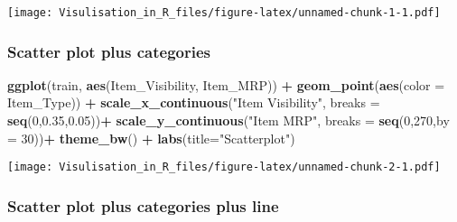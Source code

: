 \documentclass[]{article}
\newenvironment{Shaded}{\begin{snugshade}}{\end{snugshade}}
\newcommand{\KeywordTok}[1]{\textcolor[rgb]{0.13,0.29,0.53}{\textbf{#1}}}
\newcommand{\DataTypeTok}[1]{\textcolor[rgb]{0.13,0.29,0.53}{#1}}
\newcommand{\DecValTok}[1]{\textcolor[rgb]{0.00,0.00,0.81}{#1}}
\newcommand{\FloatTok}[1]{\textcolor[rgb]{0.00,0.00,0.81}{#1}}
\newcommand{\StringTok}[1]{\textcolor[rgb]{0.31,0.60,0.02}{#1}}
\newcommand{\OperatorTok}[1]{\textcolor[rgb]{0.81,0.36,0.00}{\textbf{#1}}}
\newcommand{\NormalTok}[1]{#1}
\begin{document}
\texttt{[image: Visulisation\_in\_R\_files/figure-latex/unnamed-chunk-1-1.pdf]}

\subsubsection{Scatter plot plus
categories}\label{scatter-plot-plus-categories}

\begin{Shaded}
\begin{Highlighting}[]
\KeywordTok{ggplot}\NormalTok{(train, }\KeywordTok{aes}\NormalTok{(Item_Visibility, Item_MRP)) }\OperatorTok{+}\StringTok{ }\KeywordTok{geom_point}\NormalTok{(}\KeywordTok{aes}\NormalTok{(}\DataTypeTok{color =}\NormalTok{ Item_Type)) }\OperatorTok{+}\StringTok{ }
\StringTok{  }\KeywordTok{scale_x_continuous}\NormalTok{(}\StringTok{"Item Visibility"}\NormalTok{, }\DataTypeTok{breaks =} \KeywordTok{seq}\NormalTok{(}\DecValTok{0}\NormalTok{,}\FloatTok{0.35}\NormalTok{,}\FloatTok{0.05}\NormalTok{))}\OperatorTok{+}
\StringTok{  }\KeywordTok{scale_y_continuous}\NormalTok{(}\StringTok{"Item MRP"}\NormalTok{, }\DataTypeTok{breaks =} \KeywordTok{seq}\NormalTok{(}\DecValTok{0}\NormalTok{,}\DecValTok{270}\NormalTok{,}\DataTypeTok{by =} \DecValTok{30}\NormalTok{))}\OperatorTok{+}
\StringTok{  }\KeywordTok{theme_bw}\NormalTok{() }\OperatorTok{+}\StringTok{ }\KeywordTok{labs}\NormalTok{(}\DataTypeTok{title=}\StringTok{"Scatterplot"}\NormalTok{)}
\end{Highlighting}
\end{Shaded}

\texttt{[image: Visulisation\_in\_R\_files/figure-latex/unnamed-chunk-2-1.pdf]}

\subsubsection{Scatter plot plus categories plus
line}\label{scatter-plot-plus-categories-plus-line}
\end{document}
